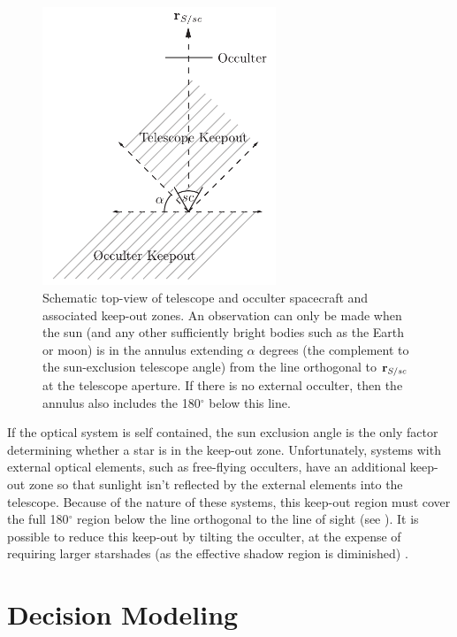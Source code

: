\begin{figure}[ht]
 \center
 \includegraphics[width=2.75in]{./figures/keepoutZones}
  \caption[keep-out Zones]{ \label{fig:keep-outZones} Schematic top-view of telescope and occulter spacecraft and associated keep-out zones.  An observation can only be made when the sun (and any other sufficiently bright bodies such as the Earth or moon) is in the annulus extending $\alpha$ degrees (the complement to the sun-exclusion telescope angle) from the line orthogonal to $\mathbf r_{S/sc}$ at the telescope aperture.  If there is no external occulter, then the annulus also includes the 180$^\circ$ below this line.}
\end{figure} 

If the optical system is self contained, the sun exclusion angle is the only factor determining whether a star is in the keep-out zone.  Unfortunately, systems with external optical elements, such as free-flying occulters, have an additional keep-out zone so that sunlight isn't reflected by the external elements into the telescope.  Because of the nature of these systems, this keep-out region must cover the full 180$^\circ$ region below the line orthogonal to the line of sight (see ). It is possible to reduce this keep-out by tilting the occulter, at the expense of requiring larger starshades (as the effective shadow region is diminished) \citep{brown2010new}.


\section{Decision Modeling}\label{sec:scheduling}


